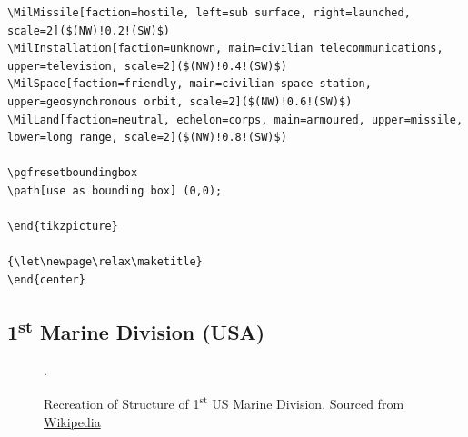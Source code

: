 \documentclass[a4paper, titlepage]{article}
\newenvironment{writett}{\ttfamily}{\par}
\begin{document}
\begin{landscape}
\begin{writett}
\begin{verbatim}
\MilMissile[faction=hostile, left=sub surface, right=launched, scale=2]($(NW)!0.2!(SW)$)
\MilInstallation[faction=unknown, main=civilian telecommunications, upper=television, scale=2]($(NW)!0.4!(SW)$)
\MilSpace[faction=friendly, main=civilian space station, upper=geosynchronous orbit, scale=2]($(NW)!0.6!(SW)$)
\MilLand[faction=neutral, echelon=corps, main=armoured, upper=missile, lower=long range, scale=2]($(NW)!0.8!(SW)$)

\pgfresetboundingbox
\path[use as bounding box] (0,0);

\end{tikzpicture}

{\let\newpage\relax\maketitle}
\end{center}
\end{verbatim}
\end{writett}

\end{landscape}

\subsection{1\textsuperscript{st} Marine Division (USA)}

\begin{figure}[H]
\centering

\caption{Recreation of Structure of 1\textsuperscript{st} US Marine Division. Sourced from \href{https://commons.wikimedia.org/wiki/File:1st_US_Marine_Division.png}{Wikipedia}}.
\label{org}
\end{figure}
\end{document}
